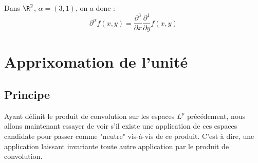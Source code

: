 \begin{example}
    Dans $\R^2$, $\alpha = (3,1)$, on a donc :
        \[ \partial^\alpha f(x,y) = \frac{\partial^3}{\partial x} \frac{\partial^1}{\partial y} f(x,y) \] 
\end{example}


\section{Apprixomation de l'unité}

\subsection{Principe }

Ayant définit le produit de convolution sur les espaces ${L}^p$ précédement, 
nous allons maintenant essayer de voir s'il existe une application de ces espaces candidate pour 
passer comme "neutre" vis-à-vis de ce produit. C'est à dire, une application laissant invariante 
toute autre application par le produit de convolution. 

